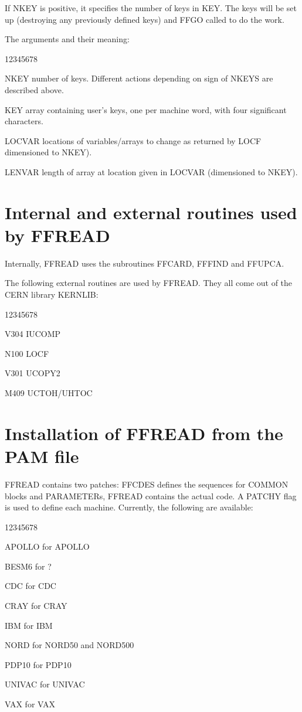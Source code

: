 If NKEY is positive, it specifies the number of keys
in KEY. The keys will be set up (destroying any previously
defined keys) and FFGO called to do the work.
 
The arguments and their meaning:
 
\begin{DLtt}{12345678}
\item[NKEY]number of keys. Different actions depending on
         sign of NKEYS are described above.
\item[KEY]array containing user's keys, one per machine word,
         with four significant characters.
\item[LOCVAR]locations of variables/arrays to change as returned
         by LOCF dimensioned to NKEY).
\item[LENVAR]length of array at location given in LOCVAR (dimensioned to NKEY).
\end{DLtt}
 
\section{Internal and external routines used by FFREAD}
 
Internally, FFREAD uses the subroutines FFCARD, FFFIND and FFUPCA.
 
The following external routines are used by FFREAD. They all come
out of the CERN library KERNLIB:
 
\begin{DLtt}{12345678}
\item[V304]IUCOMP
\item[N100]LOCF
\item[V301]UCOPY2
\item[M409]UCTOH/UHTOC
\end{DLtt}
 
\section{Installation of FFREAD from the PAM file}
 
FFREAD contains two patches: FFCDES defines the sequences for COMMON blocks
and PARAMETERs, FFREAD contains the actual code.
A PATCHY flag is used to define each machine. Currently, the following are
available:
 
\begin{DLtt}{12345678}
\item[APOLLO]for APOLLO
\item[BESM6]for ?
\item[CDC]for CDC
\item[CRAY]for CRAY
\item[IBM]for IBM
\item[NORD]for NORD50 and NORD500
\item[PDP10]for PDP10
\item[UNIVAC]for UNIVAC
\item[VAX]for VAX
\end{DLtt}

